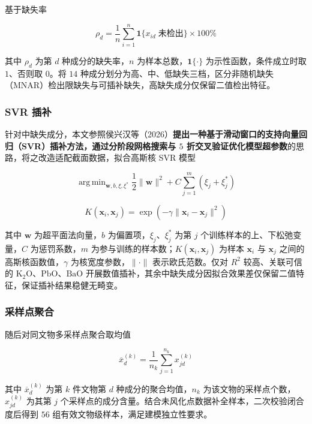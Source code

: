 \documentclass{ctexart}
\DeclareMathOperator*{\argmin}{arg\,min}
\begin{document}
基于缺失率

\begin{equation*}
\rho_{d}=\frac{1}{n}\sum_{i=1}^{n}\mathbf{1}\{x_{id}\;\text{未检出}\}\times100\%
\end{equation*}

其中 $\rho_d$ 为第 $d$ 种成分的缺失率，$n$ 为样本总数，$\mathbf{1}\{\cdot\}$ 为示性函数，条件成立时取 $1$、否则取 $0$。将 $14$ 种成分划分为高、中、低缺失三档，区分非随机缺失（MNAR）检出限缺失与可插补缺失，高缺失成分仅保留二值检出特征。


\subsubsection{SVR 插补}

针对中缺失成分，本文参照侯兴汉等（2026）\textbf{提出一种基于滑动窗口的支持向量回归（SVR）插补方法，通过分阶段网格搜索与 $5$ 折交叉验证优化模型超参数}的思路，将之改造适配截面数据，拟合高斯核 SVR 模型

\begin{equation*}
\argmin_{\boldsymbol{w},b,\xi,\xi^{*}}\frac{1}{2}\|\boldsymbol{w}\|^{2}+C\sum_{j=1}^{m}(\xi_{j}+\xi_{j}^{*})
\end{equation*}

\begin{equation*}
K(\boldsymbol{x}_{i},\boldsymbol{x}_{j})=\exp(-\gamma\|\boldsymbol{x}_{i}-\boldsymbol{x}_{j}\|^{2})
\end{equation*}

其中 $\boldsymbol{w}$ 为超平面法向量，$b$ 为偏置项，$\xi_j$、$\xi_j^{*}$ 为第 $j$ 个训练样本的上、下松弛变量，$C$ 为惩罚系数，$m$ 为参与训练的样本数；$K(\boldsymbol{x}_i,\boldsymbol{x}_j)$ 为样本 $\boldsymbol{x}_i$ 与 $\boldsymbol{x}_j$ 之间的高斯核函数值，$\gamma$ 为核宽度参数，$\|\cdot\|$ 表示欧氏范数。仅对 $R^2$ 较高、关联可信的 $\mathrm{K_2O}$、$\mathrm{PbO}$、$\mathrm{BaO}$ 开展数值插补，其余中缺失成分因拟合效果差仅保留二值特征，保证插补结果稳健无畸变。

\subsubsection{采样点聚合}

随后对同文物多采样点聚合取均值

\begin{equation*}
\overline{x}_{d}^{(k)}=\frac{1}{n_{k}}\sum_{j=1}^{n_{k}}x_{jd}^{(k)}
\end{equation*}

其中 $\overline{x}_d^{(k)}$ 为第 $k$ 件文物第 $d$ 种成分的聚合均值，$n_k$ 为该文物的采样点个数，$x_{jd}^{(k)}$ 为其第 $j$ 个采样点的成分含量。结合未风化点数据补全样本，二次校验闭合度后得到 $56$ 组有效文物级样本，满足建模独立性要求。
\end{document}
